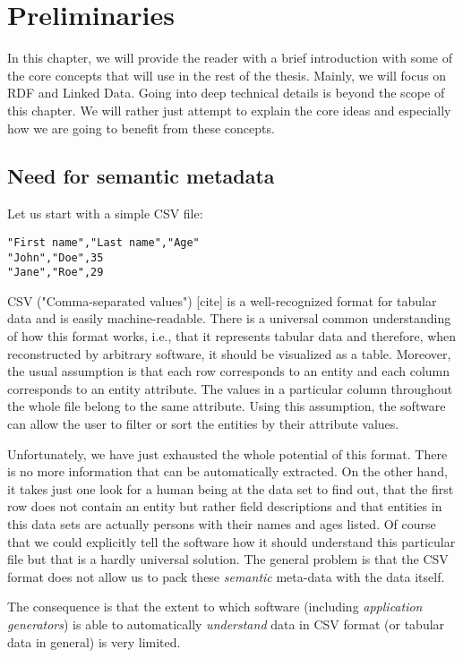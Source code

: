\chapter{Preliminaries}

In this chapter, we will provide the reader with a brief introduction with some of the core concepts that will use in the rest of the thesis. Mainly, we will focus on RDF and Linked Data. Going into deep technical details is beyond the scope of this chapter. We will rather just attempt to explain the core ideas and especially how we are going to benefit from these concepts.

\section{Need for semantic metadata}

Let us start with a simple CSV file:

\begin{verbatim}
"First name","Last name","Age"
"John","Doe",35
"Jane","Roe",29
\end{verbatim}

CSV ("Comma-separated values") [cite] is a well-recognized format for tabular data and is easily machine-readable. There is a universal common understanding of how this format works, i.e., that it represents tabular data and therefore, when reconstructed by arbitrary software, it should be visualized as a table. Moreover, the usual assumption is that each row corresponds to an entity and each column corresponds to an entity attribute. The values in a particular column throughout the whole file belong to the same attribute. Using this assumption, the software can allow the user to filter or sort the entities by their attribute values.

Unfortunately, we have just exhausted the whole potential of this format. There is no more information that can be automatically extracted. On the other hand, it takes just one look for a human being at the data set to find out, that the first row does not contain an entity but rather field descriptions and that entities in this data sets are actually persons with their names and ages listed. Of course that we could explicitly tell the software how it should understand this particular file but that is a hardly universal solution. The general problem is that the CSV format does not allow us to pack these \emph{semantic} meta-data with the data itself.

The consequence is that the extent to which software (including \emph{application generators}) is able to automatically \emph{understand} data in CSV format (or tabular data in general) is very limited.

